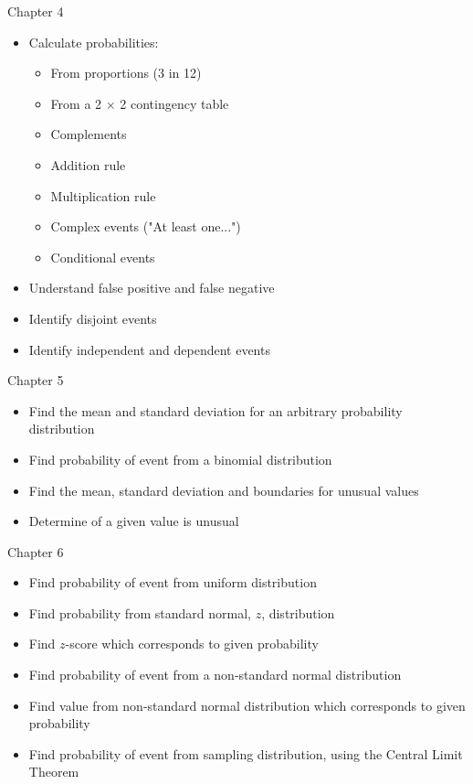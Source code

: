 \documentclass[xcolor=table]{beamer}
\begin{document}
\begin{frame}{Chapter 4}
\begin{block}{}
\begin{itemize}
\item Calculate probabilities:
\begin{itemize}
\item From proportions (3 in 12)
\item From a 2 $\times$ 2 contingency table
\item Complements
\item Addition rule
\item Multiplication rule
\item Complex events ("At least one...")
\item Conditional events
\end{itemize}
\item Understand false positive and false negative
\item Identify disjoint events
\item Identify independent and dependent events
\end{itemize}
\end{block}
\end{frame}

\begin{frame}{Chapter 5}
\begin{block}{}
\begin{itemize}
\item Find the mean and standard deviation for an arbitrary probability distribution
\item Find probability of event from a binomial distribution
\item Find the mean, standard deviation and boundaries for unusual values
\item Determine of a given value is unusual
\end{itemize}
\end{block}
\end{frame}

\begin{frame}{Chapter 6}
\begin{block}{}
\begin{itemize}
\item Find probability of event from uniform distribution
\item Find probability from standard normal, $z$, distribution
\item Find $z$-score which corresponds to given probability
\item Find probability of event from a non-standard normal distribution
\item Find value from non-standard normal distribution which corresponds to given probability
\item Find probability of event from sampling distribution, using the Central Limit Theorem
\end{itemize}
\end{block}
\end{frame}
\end{document}
